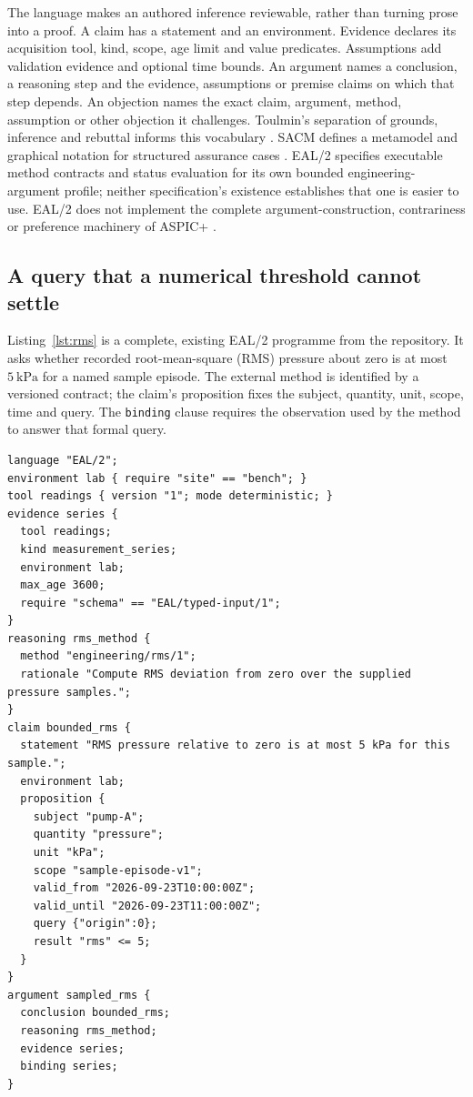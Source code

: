 \documentclass[preprint,12pt]{elsarticle}
\begin{document}
The language makes an authored inference reviewable, rather than turning prose into a proof. A claim has a statement and an environment. Evidence declares its acquisition tool, kind, scope, age limit and value predicates. Assumptions add validation evidence and optional time bounds. An argument names a conclusion, a reasoning step and the evidence, assumptions or premise claims on which that step depends. An objection names the exact claim, argument, method, assumption or other objection it challenges. Toulmin's separation of grounds, inference and rebuttal informs this vocabulary \citep{toulmin2003}. SACM defines a metamodel and graphical notation for structured assurance cases \citep{sacm2021}. EAL/2 specifies executable method contracts and status evaluation for its own bounded engineering-argument profile; neither specification's existence establishes that one is easier to use. EAL/2 does not implement the complete argument-construction, contrariness or preference machinery of ASPIC+ \citep{modgil2014}.

\subsection{A query that a numerical threshold cannot settle}
Listing~\ref{lst:rms} is a complete, existing EAL/2 programme from the repository. It asks whether recorded root-mean-square (RMS) pressure about zero is at most \(5\ \mathrm{kPa}\) for a named sample episode. The external method is identified by a versioned contract; the claim's proposition fixes the subject, quantity, unit, scope, time and query. The \texttt{binding} clause requires the observation used by the method to answer that formal query.
\begin{lstlisting}[caption={Complete EAL/2 RMS example; reproduced from examples/rms.eal at the repository revision stated in the data availability section.},label={lst:rms}]
language "EAL/2";
environment lab { require "site" == "bench"; }
tool readings { version "1"; mode deterministic; }
evidence series {
  tool readings;
  kind measurement_series;
  environment lab;
  max_age 3600;
  require "schema" == "EAL/typed-input/1";
}
reasoning rms_method {
  method "engineering/rms/1";
  rationale "Compute RMS deviation from zero over the supplied pressure samples.";
}
claim bounded_rms {
  statement "RMS pressure relative to zero is at most 5 kPa for this sample.";
  environment lab;
  proposition {
    subject "pump-A";
    quantity "pressure";
    unit "kPa";
    scope "sample-episode-v1";
    valid_from "2026-09-23T10:00:00Z";
    valid_until "2026-09-23T11:00:00Z";
    query {"origin":0};
    result "rms" <= 5;
  }
}
argument sampled_rms {
  conclusion bounded_rms;
  reasoning rms_method;
  evidence series;
  binding series;
}
\end{lstlisting}
\end{document}
